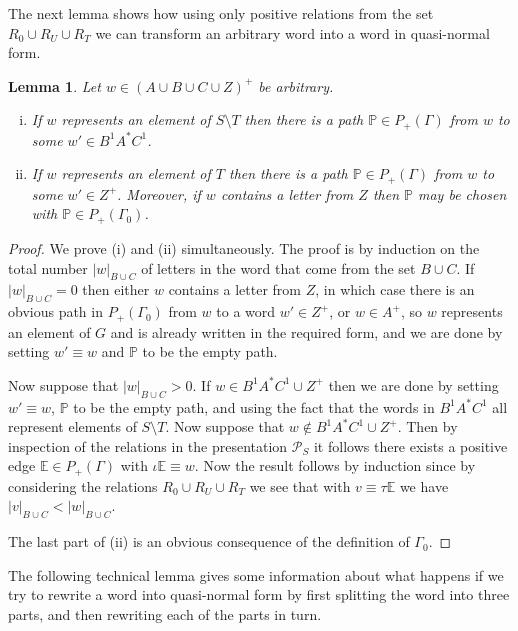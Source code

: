 \documentclass[11pt]{amsart}
\newtheorem{lem}{Lemma}
\theoremstyle{plain}
\begin{document}
The next lemma shows how using only positive relations from the set $R_0 \cup R_U \cup R_T$ we can transform an arbitrary word into a word in quasi-normal form.
\begin{lem}\label{Lemma1}
Let $w \in (A \cup B \cup C \cup Z)^+$ be arbitrary.
\begin{enumerate}[(i)]
\item If $w$ represents an element of $S \setminus T$ then there is a path ${\mathbb{P}} \in P_+(\Gamma)$ from $w$ to some $w' \in B^1 A^* C^1$. 
\item If $w$ represents an element of $T$ then there is a path ${\mathbb{P}} \in P_+(\Gamma)$ from $w$ to some $w' \in Z^+$. Moreover, if $w$ contains a letter from $Z$ then ${\mathbb{P}}$ may be chosen with ${\mathbb{P}} \in P_+(\Gamma_0)$. 
\end{enumerate}
\end{lem}
\begin{proof}
We prove (i) and (ii) simultaneously. The proof is by induction on the total number $|w|_{B \cup C}$ of letters in the word that come from the set $B \cup C$. If $|w|_{B \cup C}=0$ then either $w$ contains a letter from $Z$, in which case there is an obvious path in $P_+(\Gamma_0)$ from $w$ to a word $w' \in Z^+$, or $w \in A^+$, so  $w$ represents an element of $G$ and is already written in the required form, and we are done by setting $w' \equiv w$ and ${\mathbb{P}}$ to be the empty path.

Now suppose that $|w|_{B \cup C} > 0$. If $w \in B^1 A^* C^1 \cup Z^+$ then we are done by setting $w' \equiv w$, ${\mathbb{P}}$ to be the empty path, and using the fact that the words in $B^1 A^* C^1$ all represent elements of $S \setminus T$. Now suppose that $w \not\in B^1 A^* C^1 \cup Z^+$. Then by inspection of the relations in the presentation $\mathcal{P}_S$ it follows there exists a positive edge ${\mathbb{E}} \in P_+(\Gamma)$ with $\iota {\mathbb{E}} \equiv w$. Now the result follows by induction since by considering the relations $R_0 \cup R_U \cup R_T$ we see that with $v \equiv \tau {\mathbb{E}}$ we have $|v|_{B \cup C} < |w|_{B \cup C}$.

The last part of (ii) is an obvious consequence of the definition of $\Gamma_0$.
\end{proof}

The following technical lemma gives some information about what happens if we try to rewrite a word into quasi-normal form by first splitting the word into three parts, and then rewriting each of the parts in turn. 
\end{document}
